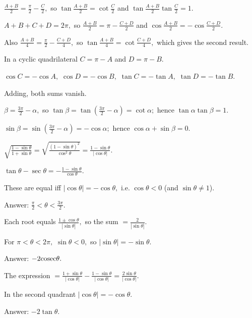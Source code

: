   $\frac{A + B}{2} = \frac{\pi}{2} - \frac{C}{2},$ so $\tan\frac{A + B}{2} = \cot\frac{C}{2}$ and $\tan\frac{A +
  B}{2}\tan\frac{C}{2} = 1.$

\item $A + B + C + D = 2\pi,$ so $\frac{A + B}{2} = \pi - \frac{C + D}{2}$ and $\cos\frac{A + B}{2} = -\cos\frac{C + D}{2}.$

  Also $\frac{A + B}{4} = \frac{\pi}{2} - \frac{C + D}{4},$ so $\tan\frac{A + B}{4} = \cot\frac{C + D}{4},$ which gives the
  second result.

\item In a cyclic quadrilateral $C = \pi - A$ and $D = \pi - B.$

  $\cos C = -\cos A,$ $\cos D = -\cos B,$ $\tan C = -\tan A,$ $\tan D = -\tan B.$

  Adding, both sums vanish.

\item $\beta = \frac{3\pi}{2} - \alpha,$ so $\tan\beta = \tan\left(\frac{3\pi}{2} - \alpha\right) = \cot\alpha;$ hence
  $\tan\alpha\tan\beta = 1.$

  $\sin\beta = \sin\left(\frac{3\pi}{2} - \alpha\right) = -\cos\alpha;$ hence $\cos\alpha + \sin\beta = 0.$

\item $\sqrt{\frac{1 - \sin\theta}{1 + \sin\theta}} = \sqrt{\frac{(1 - \sin\theta)^2}{\cos^2\theta}} = \frac{1 -
    \sin\theta}{|\cos\theta|}.$

  $\tan\theta - \sec\theta = -\frac{1 - \sin\theta}{\cos\theta}.$

  These are equal iff $|\cos\theta| = -\cos\theta,$ i.e. $\cos\theta < 0$ (and $\sin\theta \neq 1$).

  Answer: $\frac{\pi}{2} < \theta < \frac{3\pi}{2}.$

\item Each root equals $\frac{1 \pm \cos\theta}{|\sin\theta|},$ so the sum $= \frac{2}{|\sin\theta|}.$

  For $\pi < \theta < 2\pi,$ $\sin\theta < 0,$ so $|\sin\theta| = -\sin\theta.$

  Answer: $-2{\rm cosec}\theta.$

\item The expression $= \frac{1 + \sin\theta}{|\cos\theta|} - \frac{1 - \sin\theta}{|\cos\theta|} =
  \frac{2\sin\theta}{|\cos\theta|}.$

  In the second quadrant $|\cos\theta| = -\cos\theta.$

  Answer: $-2\tan\theta.$

